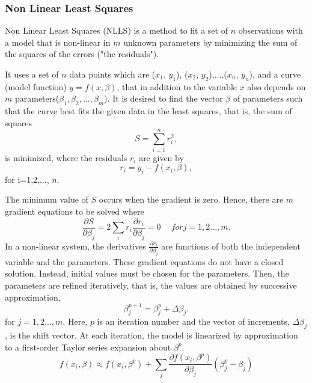 \documentclass[journal]{IEEEtran}
\begin{document}
\subsubsection{\textbf{Non Linear Least Squares}}
\par Non Linear Least Squares (NLLS) is a method to fit a set of $n$ observations with a model that is non-linear in $m$ unknown parameters by minimizing the sum of the squares of the errors ("the residuals").
\par
It uses a set of $n$ data points which are ($x_1$, $y_1$), ($x_2$, $y_2$),$\dots$,($x_n$, $y_n$), and a curve (model function) $y= f(x, \beta)$, that in addition to the variable $x$ also depends on $m$ parameters($\beta_1,\beta_2,...,\beta_m$).
It is desired to find the vector $\beta$ of parameters such that the curve best fits the given data in the least squares, that is, the sum of squares
\begin{equation}
    S=\sum_{i=1}^{n}r_i^2 ,
\end{equation}
is minimized, where the residuals $r_i$ are given by
\begin{equation}
    r_i = y_i - f(x_i,\beta),
\end{equation}
for i=1,2,$\dots$, $n$.
\par
The minimum value of $S$ occurs when the gradient is zero. Hence, there are $m$ gradient equations to be solved where
\begin{equation}
    \frac{\partial S}{\partial \beta_j}=2\sum_i r_i\frac{\partial r_i}{\partial \beta_j}=0 \ \quad for j=1,2...,m.
\end{equation}
In a non-linear system, the derivatives $\frac{\partial r_i}{\partial \beta_j}$ are functions of both the independent
variable and the parameters. These gradient equations do not have a closed solution. Instead, initial values must be chosen for the
parameters. Then, the parameters are refined iteratively, that is, the values are obtained by successive approximation,
\begin{equation}
    \beta_j^{p+1}=\beta^p_j+\Delta \beta_j.
\end{equation}
for $j=1,2...,m.$ Here, $p$ is an iteration number and the vector of increments, $\Delta \beta_j$, is the shift vector. At each iteration, the model is linearized by approximation to a first-order Taylor series expansion about $\beta^p$.
\begin{equation}
    f(x_i,\beta)\approx f(x_i,\beta^p) +\sum_j \frac{\partial f(x_i, \beta^p)}{\partial \beta_j} \left(\beta^p_j -\beta_j \right)
\end{equation}
\end{document}
